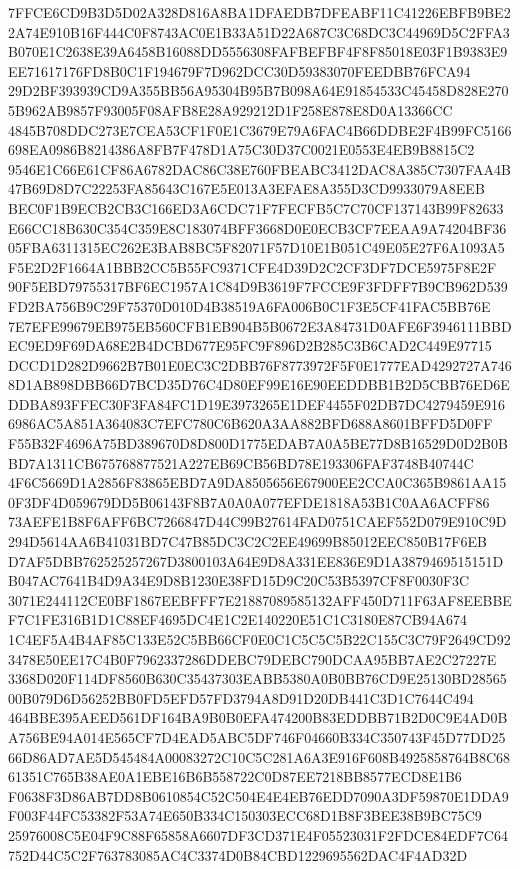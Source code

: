 \documentclass[UTF8,fontset=fandol,zihao=-4,a4paper]{ctexart}
\begin{document}
{{7FFCE6CD9B3D5D02A328D816A8BA1DFAEDB7DFEABF11C41226EBFB9BE22A74E910B16F444C0F8743AC0E1B33A51D22A687C3C68DC3C44969D5C2FFA3
B070E1C2638E39A6458B16088DD5556308FAFBEFBF4F8F85018E03F1B9383E9EE71617176FD8B0C1F194679F7D962DCC30D59383070FEEDBB76FCA94
29D2BF393939CD9A355BB56A95304B95B7B098A64E91854533C45458D828E2705B962AB9857F93005F08AFB8E28A929212D1F258E878E8D0A13366CC
4845B708DDC273E7CEA53CF1F0E1C3679E79A6FAC4B66DDBE2F4B99FC5166698EA0986B8214386A8FB7F478D1A75C30D37C0021E0553E4EB9B8815C2
9546E1C66E61CF86A6782DAC86C38E760FBEABC3412DAC8A385C7307FAA4B47B69D8D7C22253FA85643C167E5E013A3EFAE8A355D3CD9933079A8EEB
BEC0F1B9ECB2CB3C166ED3A6CDC71F7FECFB5C7C70CF137143B99F82633E66CC18B630C354C359E8C183074BFF3668D0E0ECB3CF7EEAA9A74204BF36
05FBA6311315EC262E3BAB8BC5F82071F57D10E1B051C49E05E27F6A1093A5F5E2D2F1664A1BBB2CC5B55FC9371CFE4D39D2C2CF3DF7DCE5975F8E2F
90F5EBD79755317BF6EC1957A1C84D9B3619F7FCCE9F3FDFF7B9CB962D539FD2BA756B9C29F75370D010D4B38519A6FA006B0C1F3E5CF41FAC5BB76E
7E7EFE99679EB975EB560CFB1EB904B5B0672E3A84731D0AFE6F3946111BBDEC9ED9F69DA68E2B4DCBD677E95FC9F896D2B285C3B6CAD2C449E97715
DCCD1D282D9662B7B01E0EC3C2DBB76F8773972F5F0E1777EAD4292727A7468D1AB898DBB66D7BCD35D76C4D80EF99E16E90EEDDBB1B2D5CBB76ED6E
DDBA893FFEC30F3FA84FC1D19E3973265E1DEF4455F02DB7DC4279459E9166986AC5A851A364083C7EFC780C6B620A3AA882BFD688A8601BFFD5D0FF
F55B32F4696A75BD389670D8D800D1775EDAB7A0A5BE77D8B16529D0D2B0BBD7A1311CB675768877521A227EB69CB56BD78E193306FAF3748B40744C
4F6C5669D1A2856F83865EBD7A9DA8505656E67900EE2CCA0C365B9861AA150F3DF4D059679DD5B06143F8B7A0A0A077EFDE1818A53B1C0AA6ACFF86
73AEFE1B8F6AFF6BC7266847D44C99B27614FAD0751CAEF552D079E910C9D294D5614AA6B41031BD7C47B85DC3C2C2EE49699B85012EEC850B17F6EB
D7AF5DBB762525257267D3800103A64E9D8A331EE836E9D1A3879469515151DB047AC7641B4D9A34E9D8B1230E38FD15D9C20C53B5397CF8F0030F3C
3071E244112CE0BF1867EEBFFF7E21887089585132AFF450D711F63AF8EEBBEF7C1FE316B1D1C88EF4695DC4E1C2E140220E51C1C3180E87CB94A674
1C4EF5A4B4AF85C133E52C5BB66CF0E0C1C5C5C5B22C155C3C79F2649CD923478E50EE17C4B0F7962337286DDEBC79DEBC790DCAA95BB7AE2C27227E
3368D020F114DF8560B630C35437303EABB5380A0B0BB76CD9E25130BD2856500B079D6D56252BB0FD5EFD57FD3794A8D91D20DB441C3D1C7644C494
464BBE395AEED561DF164BA9B0B0EFA474200B83EDDBB71B2D0C9E4AD0BA756BE94A014E565CF7D4EAD5ABC5DF746F04660B334C350743F45D77DD25
66D86AD7AE5D545484A00083272C10C5C281A6A3E916F608B4925858764B8C6861351C765B38AE0A1EBE16B6B558722C0D87EE7218BB8577ECD8E1B6
F0638F3D86AB7DD8B0610854C52C504E4E4EB76EDD7090A3DF59870E1DDA9F003F44FC53382F53A74E650B334C150303ECC68D1B8F3BEE38B9BC75C9
25976008C5E04F9C88F65858A6607DF3CD371E4F05523031F2FDCE84EDF7C64752D44C5C2F763783085AC4C3374D0B84CBD1229695562DAC4F4AD32D
}}
\end{document}

